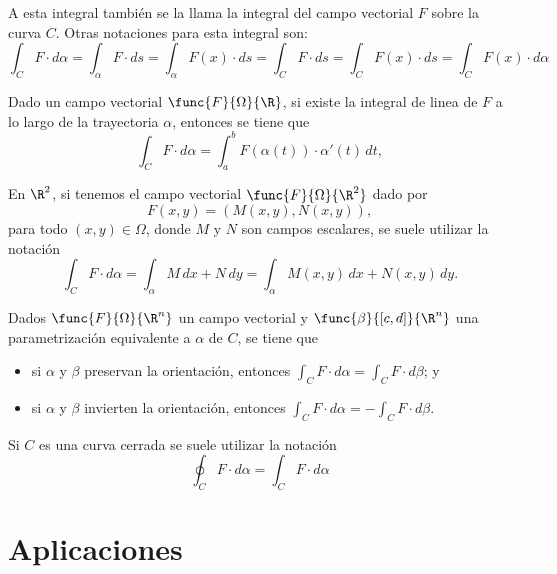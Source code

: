 \documentclass[a4,11pt]{aleph-notas}
\begin{document}
\begin{advertencia}
    A esta integral también se la llama la integral del campo vectorial $F$ sobre la curva $C$. Otras notaciones para esta integral son:
    \[
        \int_C F \cdot d\alpha 
        = \int_\alpha F \cdot ds 
        = \int_\alpha F(x) \cdot ds 
        = \int_C F \cdot ds
        = \int_C F(x) \cdot ds
        = \int_C F(x) \cdot d\alpha
    \]
\end{advertencia}

\begin{teo}
    Dado un campo vectorial $\func{F}{\Omega}{\R}$, si existe la integral de linea de $F$ a lo largo de la trayectoria $\alpha$, entonces se tiene que
    \[
        \int_C F \cdot d\alpha 
        =\int_a^b F(\alpha(t))\cdot \alpha'(t)\,dt,
    \]
\end{teo}

\begin{advertencia}
    En $\R^2$, si tenemos el campo vectorial $\func{F}{\Omega}{\R^2}$ dado por
    \[
        F(x,y) = (M(x,y),N(x,y)),
    \]
    para todo $(x,y)\in \Omega$, donde $M$ y $N$ son campos escalares, se suele utilizar la notación
    \[
        \int_C F \cdot d\alpha 
        = \int_\alpha M\,dx + N\,dy
        = \int_\alpha M(x,y)\,dx + N(x,y)\,dy.
    \]
\end{advertencia}

\begin{prop}
    Dados $\func{F}{\Omega}{\R^n}$ un campo vectorial y $\func{\beta}{[c,d]}{\R^n}$ una parametrización equivalente a $\alpha$ de $C$, se tiene que
    \begin{itemize}
        \item si $\alpha$ y $\beta$ preservan la orientación, entonces $\int_C F \cdot d\alpha = \int_C F \cdot d\beta$; y
        \item si $\alpha$ y $\beta$ invierten la orientación, entonces $\int_C F \cdot d\alpha = - \int_C F \cdot d\beta$.
    \end{itemize}
\end{prop}

\begin{advertencia}
    Si $C$ es una curva cerrada se suele utilizar la notación
    \[
        \oint_C F \cdot d\alpha = \int_C F \cdot d\alpha
    \]
\end{advertencia}


\section{Aplicaciones}
\end{document}
